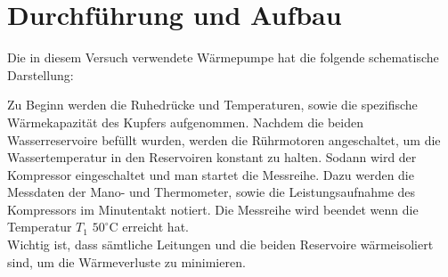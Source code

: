 \section{Durchführung und Aufbau}
\label{sec:Durchführung}

Die in diesem Versuch verwendete Wärmepumpe hat die folgende schematische Darstellung:


Zu Beginn werden die Ruhedrücke und Temperaturen, sowie die spezifische Wärmekapazität des Kupfers aufgenommen. Nachdem die beiden Wasserreservoire befüllt wurden, werden die Rührmotoren angeschaltet, um die Wassertemperatur in den Reservoiren konstant zu halten. Sodann wird der Kompressor eingeschaltet und man startet die Messreihe. Dazu werden die Messdaten der Mano- und Thermometer, sowie die Leistungsaufnahme des Kompressors im Minutentakt notiert. Die Messreihe wird beendet wenn die Temperatur $T_\text{1}$ $50^\circ \text{C}$ erreicht hat. \\
Wichtig ist, dass sämtliche Leitungen und die beiden Reservoire wärmeisoliert sind, um die Wärmeverluste zu minimieren.
